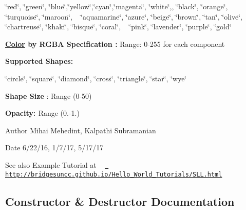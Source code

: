 \char`\"{}red\char`\"{}, \char`\"{}green\char`\"{}, \char`\"{}blue\char`\"{},\char`\"{}yellow\char`\"{},\char`\"{}cyan\char`\"{},\char`\"{}magenta\char`\"{}, \char`\"{}white\char`\"{},, \char`\"{}black\char`\"{}, \char`\"{}orange\char`\"{}, \char`\"{}turquoise\char`\"{}, \char`\"{}maroon\char`\"{}, ~\newline
 \char`\"{}aquamarine\char`\"{}, \char`\"{}azure\char`\"{}, \char`\"{}beige\char`\"{}, \char`\"{}brown\char`\"{}, \char`\"{}tan\char`\"{}, \char`\"{}olive\char`\"{}, \char`\"{}chartreuse\char`\"{}, \char`\"{}khaki\char`\"{}, \char`\"{}bisque\char`\"{}, \char`\"{}coral\char`\"{}, ~\newline
 \char`\"{}pink\char`\"{}, \char`\"{}lavender\char`\"{}, \char`\"{}purple\char`\"{}, \char`\"{}gold\char`\"{} 

{\bfseries{ \mbox{\hyperlink{classbridges_1_1base_1_1_color}{Color}} by R\+G\+BA Specification \+:}} Range\+: 0-\/255 for each component 

{\bfseries{Supported Shapes\+: }}

\char`\"{}circle\char`\"{}, \char`\"{}square\char`\"{}, \char`\"{}diamond\char`\"{}, \char`\"{}cross\char`\"{}, \char`\"{}triangle\char`\"{}, \char`\"{}star\char`\"{}, \char`\"{}wye\char`\"{} 

{\bfseries{ Shape Size}} \+: Range (0-\/50) 

{\bfseries{ Opacity\+: }} Range (0.-\/1.) 

\begin{DoxyAuthor}{Author}
Mihai Mehedint, Kalpathi Subramanian
\end{DoxyAuthor}
\begin{DoxyDate}{Date}
6/22/16, 1/7/17, 5/17/17
\end{DoxyDate}
\begin{DoxySeeAlso}{See also}
Example Tutorial at ~\newline
 \href{http://bridgesuncc.github.io/Hello_World_Tutorials/SLL.html}{\texttt{ http\+://bridgesuncc.\+github.\+io/\+Hello\+\_\+\+World\+\_\+\+Tutorials/\+S\+L\+L.\+html}} 
\end{DoxySeeAlso}


\subsection{Constructor \& Destructor Documentation}
\mbox{\label{classbridges_1_1base_1_1_element_visualizer_acbca874876ec1e8dbbde6484a4fc056e}} 

